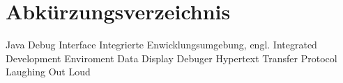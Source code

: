 
\chapter*{Abkürzungsverzeichnis}

\begin{acronym}
  {Java Debug Interface}
  {Integrierte Enwicklungsumgebung, engl. Integrated Development Enviroment}
  {Data Display Debuger}
  {Hypertext Transfer Protocol}
  {Laughing Out Loud}
\end{acronym}